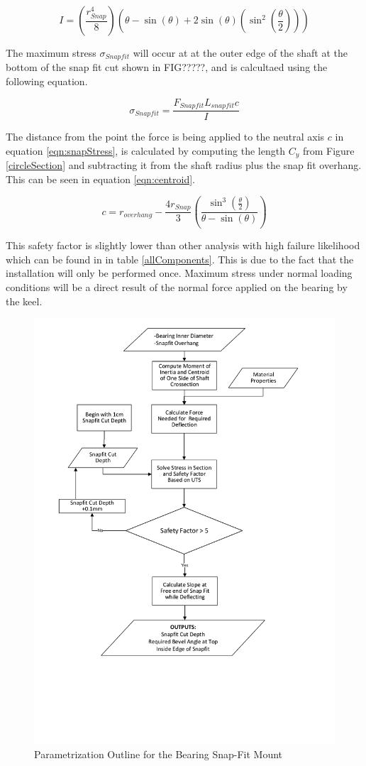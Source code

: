 \documentclass[../main.tex]{subfiles}
\begin{document}
\begin{equation}
\label{eqn:Isnap}
I = \left(\frac{r_{Snap}^4}{8}\right)  \left(\theta -\sin(\theta)+2\sin(\theta)(\sin^2\left(\frac{\theta}{2}\right))\right)
\end{equation}

The maximum stress $\sigma_{Snapfit}$ will occur at at the outer edge of the shaft at the bottom of the snap fit cut shown in FIG?????, and is calcultaed using the following equation.

\begin{equation}
\label{eqn:snapStress}
\sigma_{Snapfit} = \frac{F_{Snapfit} L_{snapfit} c}{I}
\end{equation}

The distance from the point the force is being applied to the neutral axis $c$ in equation \ref{eqn:snapStress}, is calculated by computing the length $C_y$ from Figure \ref{circleSection} and subtracting it from the shaft radius plus the snap fit overhang. This can be seen in equation \ref{eqn:centroid}. 

 \begin{equation}
 \label{eqn:centroid}
 c = r_{overhang} - \frac{4r_{Snap}}{3}\left(\frac{\sin^3\left(\frac{\theta}{2}\right)} {\theta-\sin(\theta)}\right)
 \end{equation}

 This safety factor is slightly lower than other analysis with high failure likelihood which can be found in in table \ref{allComponents}. This is due to the fact that the installation will only be performed once. Maximum stress under normal loading conditions will be a direct result of the normal force applied on the bearing by the keel.

\begin{figure}[H]
	\centering
	\includegraphics[width=.8\linewidth]{img/paramaterization/snapFit.pdf}
	\caption{Parametrization Outline for the Bearing Snap-Fit Mount}
	\label{fig:snapFitParametrization}
\end{figure}
\end{document}
